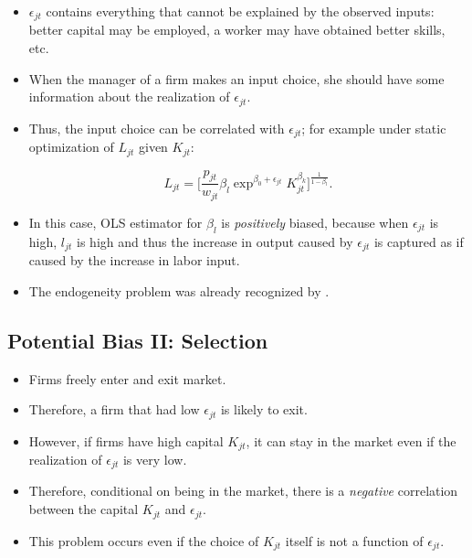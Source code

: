 \documentclass[]{book}
\providecommand{\tightlist}{%
  \setlength{\itemsep}{0pt}\setlength{\parskip}{0pt}}
\begin{document}
\begin{itemize}
\tightlist
\item
  \(\epsilon_{jt}\) contains everything that cannot be explained by the
  observed inputs: better capital may be employed, a worker may have
  obtained better skills, etc.
\item
  When the manager of a firm makes an input choice, she should have some
  information about the realization of \(\epsilon_{jt}\).
\item
  Thus, the input choice can be correlated with \(\epsilon_{jt}\); for
  example under static optimization of \(L_{jt}\) given \(K_{jt}\):

  \begin{equation}
  L_{jt} = \Bigg[\frac{p_{jt}}{w_{jt}} \beta_l \exp^{\beta_0 + \epsilon_{jt}} K_{jt}^{\beta_k}\Bigg]^{\frac{1}{1 - \beta_l}}.
  \end{equation}
\item
  In this case, OLS estimator for \(\beta_l\) is \textit{positively}
  biased, because when \(\epsilon_{jt}\) is high, \(l_{jt}\) is high and
  thus the increase in output caused by \(\epsilon_{jt}\) is captured as
  if caused by the increase in labor input.
\item
  The endogeneity problem was already recognized by
  \citet{Marschak1944}.
\end{itemize}

\subsection{Potential Bias II:
Selection}\label{potential-bias-ii-selection}

\begin{itemize}
\tightlist
\item
  Firms freely enter and exit market.
\item
  Therefore, a firm that had low \(\epsilon_{jt}\) is likely to exit.
\item
  However, if firms have high capital \(K_{jt}\), it can stay in the
  market even if the realization of \(\epsilon_{jt}\) is very low.
\item
  Therefore, conditional on being in the market, there is a
  \textit{negative} correlation between the capital \(K_{jt}\) and
  \(\epsilon_{jt}\).
\item
  This problem occurs even if the choice of \(K_{jt}\) itself is not a
  function of \(\epsilon_{jt}\).
\end{itemize}
\end{document}
